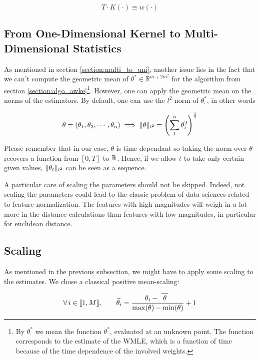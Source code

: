 \documentclass[11pt]{book}
\begin{document}
$$ T \cdot K ( \cdot ) \equiv w ( \cdot ) $$

\subsection{From One-Dimensional Kernel to Multi-Dimensional Statistics}
As mentioned in section \ref{section:multi_to_uni}, another issue lies in the fact that we can't compute the geometric mean of $\theta^*_{\cdot} \in \mathbb R^{m+2m^2}$ for the algorithm from section \ref{section:algo_awke}\footnote{By $\theta^*_{\cdot}$ we mean the function $\theta^*$, evaluated at an unknown point. The function corresponds to the estimate of the WMLE, which is a function of time because of the time dependence of the involved weights.}.
However, one can apply the geometric mean on the norms of the estimators. By default, one can use the $l^2$ norm of $\theta^*_{\cdot}$, in other words

$$\theta = (\theta_1, \theta_2, \cdots, \theta_n ) \implies 
\lVert \theta\rVert_{l^2} = \left ( \sum^n_1 \theta_i^2 \right )^{\frac 1 2}$$ 

Please remember that in our case, $\theta$ is time dependant so taking the norm over $\theta$ recovers a function from $[0,T]$ to $\mathbb{R}$. Hence, if we allow $t$ to take only certain given values, $\lVert \theta_t\rVert_{l^2}$ can be seen as a sequence.


\begin{remarque}
A particular care of scaling the parameters should not be skipped. Indeed, not scaling the parameters could lead to the classic problem of data-sciences related to feature normalization. The features with high magnitudes will weigh in a lot more in the distance calculations than features with low magnitudes, in particular for euclidean distance.
\end{remarque}

\subsection{Scaling}
\label{subsection:scaling}

As mentioned in the previous subsection, we might have to apply some scaling to the estimates. We chose a classical positive mean-scaling:

\begin{equation}
\forall i \in  \llbracket 1, M \rrbracket, \qquad  \widetilde{\theta_i } = \frac{\theta_i - \mean \theta }{\max(\theta) - \min(\theta) } + 1 
\label{rescale-function}
\end{equation}
\end{document}
